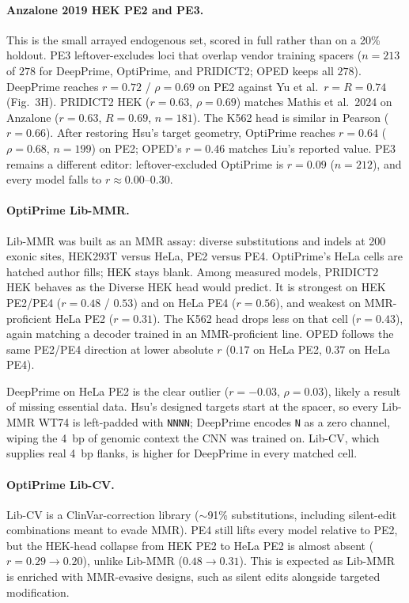 \documentclass{article}
\begin{document}
\paragraph{Anzalone 2019 HEK PE2 and PE3.}
This is the small arrayed endogenous set, scored in full rather than on a 20\% holdout. PE3 leftover-excludes loci that overlap vendor training spacers ($n = 213$ of $278$ for DeepPrime, OptiPrime, and PRIDICT2; OPED keeps all $278$). DeepPrime reaches $r = 0.72$ / $\rho = 0.69$ on PE2 against Yu et al.\ $r = R = 0.74$ (Fig.~3H)\cite{yuPredictionEfficienciesDiverse2023}. PRIDICT2 HEK ($r = 0.63$, $\rho = 0.69$) matches Mathis et al.\ 2024 on Anzalone ($r = 0.63$, $R = 0.69$, $n = 181$). The K562 head is similar in Pearson ($r = 0.66$). After restoring Hsu's target geometry, OptiPrime reaches $r = 0.64$ ($\rho = 0.68$, $n = 199$) on PE2; OPED's $r = 0.46$ matches Liu's reported value. PE3 remains a different editor: leftover-excluded OptiPrime is $r = 0.09$ ($n = 212$), and every model falls to $r \approx 0.00$--$0.30$.

\paragraph{OptiPrime Lib-MMR.}
Lib-MMR was built as an MMR assay: diverse substitutions and indels at 200 exonic sites, HEK293T versus HeLa, PE2 versus PE4\cite{hsuMechanisticMachineLearning2026}. OptiPrime's HeLa cells are hatched author fills; HEK stays blank. Among measured models, PRIDICT2 HEK behaves as the Diverse HEK head would predict. It is strongest on HEK PE2/PE4 ($r = 0.48$ / $0.53$) and on HeLa PE4 ($r = 0.56$), and weakest on MMR-proficient HeLa PE2 ($r = 0.31$). The K562 head drops less on that cell ($r = 0.43$), again matching a decoder trained in an MMR-proficient line. OPED follows the same PE2/PE4 direction at lower absolute $r$ ($0.17$ on HeLa PE2, $0.37$ on HeLa PE4).

DeepPrime on HeLa PE2 is the clear outlier ($r = -0.03$, $\rho = 0.03$), likely a result of missing essential data. Hsu's designed targets start at the spacer, so every Lib-MMR WT74 is left-padded with \texttt{NNNN}; DeepPrime encodes \texttt{N} as a zero channel, wiping the 4~bp of genomic context the CNN was trained on. Lib-CV, which supplies real 4~bp flanks, is higher for DeepPrime in every matched cell. 

\paragraph{OptiPrime Lib-CV.}
Lib-CV is a ClinVar-correction library (${\sim}$91\% substitutions, including silent-edit combinations meant to evade MMR)\cite{hsuMechanisticMachineLearning2026}. PE4 still lifts every model relative to PE2, but the HEK-head collapse from HEK PE2 to HeLa PE2 is almost absent ($r = 0.29 \to 0.20$), unlike Lib-MMR ($0.48 \to 0.31$). This is expected as Lib-MMR is enriched with MMR-evasive designs, such as silent edits alongside targeted modification\cite{hsuMechanisticMachineLearning2026}.
\end{document}
